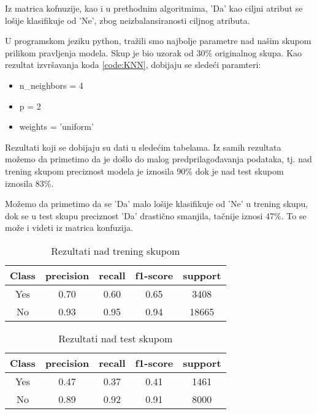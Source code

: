 \documentclass[a4paper]{article}
\begin{document}
Iz matrica kofnuzije, kao i u prethodnim algoritmima, 'Da' kao ciljni atribut  se lošije klasifikuje od 'Ne', zbog neizbalansiranosti ciljnog atributa.

U programskom jeziku python, tražili smo najbolje parametre nad našim skupom prilikom pravljenja modela. Skup je bio uzorak od 30\% originalnog skupa.
Kao rezultat izvršavanja koda \ref{code:KNN}, dobijaju se sledeći paramteri:
\begin{itemize}
    \item n\_neighbors = 4
    \item p = 2
    \item  weights = 'uniform'
\end{itemize}

\label{code:KNN}


Rezultati koji se dobijaju su dati u sledećim tabelama. Iz samih rezultata možemo da primetimo da je došlo do malog predprilagođavanja podataka, tj. nad trening skupom preciznost modela je iznosila 90\% dok je nad test skupom iznosila 83\%.\par




Možemo da primetimo da se 'Da' malo lošije klasifikuje od 'Ne' u trening skupu, dok se u test skupu preciznost 'Da' drastično smanjila, tačnije iznosi 47\%. To se može i videti iz matrica konfuzija.\par
    \begin{table}[H]
        \begin{center}
        \caption{Rezultati nad trening skupom}
        \label{tab:KNN-py-train}
        \begin{tabular}{|c|c|c|c|c|} \hline
        \textbf{Class} & \textbf{precision} & \textbf{recall}  & \textbf{f1-score} & \textbf{support} \\ \hline
        Yes &  0.70&      0.60  &    0.65   &   3408 \\ \hline
        No & 0.93    &  0.95 &     0.94   &  18665 \\ \hline
        \end{tabular}
        \end{center}
    \end{table}
        
    \begin{table}[H]
        \begin{center}
        \caption{Rezultati nad test skupom}
        \label{tab:KNN-py-test}
        \begin{tabular}{|c|c|c|c|c|} \hline
        \textbf{Class} & \textbf{precision} & \textbf{recall}  & \textbf{f1-score} & \textbf{support} \\ \hline
        Yes &  0.47    &  0.37     & 0.41  &    1461 \\ \hline
        No & 0.89   &   0.92   &  0.91    &  8000 \\ \hline
        \end{tabular}
        \end{center}
    \end{table}
    
\end{document}
